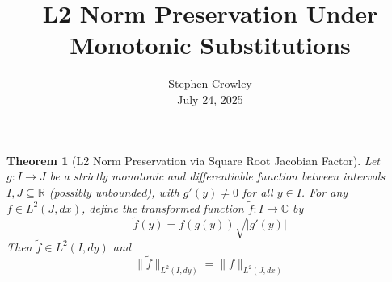 \documentclass{article}
\newcommand{\tmaffiliation}[1]{\\ #1}
\newtheorem{theorem}{Theorem}
\begin{document}
\title{L2 Norm Preservation Under Monotonic Substitutions}

\author{
  Stephen Crowley
  \tmaffiliation{July 24, 2025}
}

\date{}

\maketitle

\begin{theorem}
  [L2 Norm Preservation via Square Root Jacobian Factor] Let $g : I \to J$ be
  a strictly monotonic and differentiable function between intervals $I, J
  \subseteq \mathbb{R}$ (possibly unbounded), with $g' (y) \neq 0$ for all $y
  \in I$. For any $f \in L^2 (J, dx)$, define the transformed function
  $\tilde{f} : I \to \mathbb{C}$ by
  \begin{equation}
    \tilde{f} (y) = f (g (y)) \sqrt{|g' (y) |}
  \end{equation}
  Then $\tilde{f} \in L^2 (I, dy)$ and
  \begin{equation}
    \| \tilde{f} \|_{L^2 (I, dy)} = \|f\|_{L^2 (J, dx)}
  \end{equation}
\end{theorem}
\end{document}

